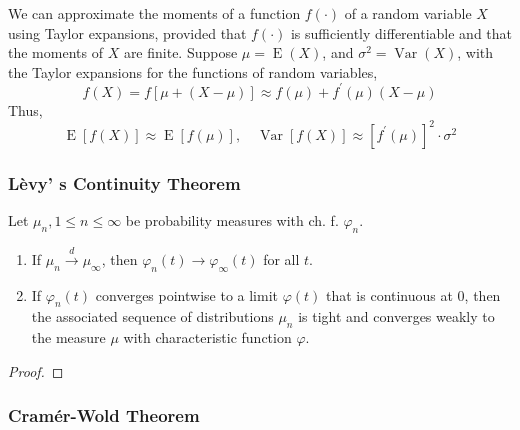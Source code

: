 \begin{remark}
	We can approximate the moments of a function $f(\cdot)$ of a random variable $X$ using Taylor expansions, provided that $f(\cdot)$ is sufficiently differentiable and that the moments of $X$ are finite. Suppose $\mu=\operatorname{E}\left(X\right)$, and $\sigma^{2}=\operatorname{Var}\left(X\right)$, with the Taylor expansions for the functions of random variables,
	\begin{equation}
		f\left(X\right)=f\left[\mu+\left(X-\mu\right)\right]\approx f\left(\mu\right)+f^{\prime}\left(\mu\right)\left(X-\mu\right)
	\end{equation}
	Thus,
	\begin{equation}
		\operatorname{E}\left[f\left(X\right)\right]\approx\operatorname{E}\left[f\left(\mu\right)\right],\quad\operatorname{Var}\left[f(X)\right]\approx\left[f^{\prime}\left(\mu\right)\right]^{2}\cdot\sigma^{2}
	\end{equation}
\end{remark}

\subsubsection{L\`evy' s Continuity Theorem}

\begin{theorem}
	Let $\mu_{n},1\leq n\leq\infty$ be probability measures with ch. f. $\varphi_{n}$.
	\begin{enumerate}
		\item If $\mu_{n}\stackrel{d}{\rightarrow}\mu_{\infty}$, then $\varphi_{n}(t)\rightarrow\varphi_{\infty}(t)$ for all $t$.
		\item If $\varphi_{n}(t)$ converges pointwise to a limit $\varphi(t)$ that is continuous at $0$, then the associated sequence of distributions $\mu_{n}$ is tight and converges weakly to the measure $\mu$ with characteristic function $\varphi$.
	\end{enumerate}
\end{theorem}

\begin{proof}

\end{proof}

\subsubsection{Cram\'er-Wold Theorem}

\begin{theorem} \label{thm:cramer-wold-theorem}

\end{theorem}


